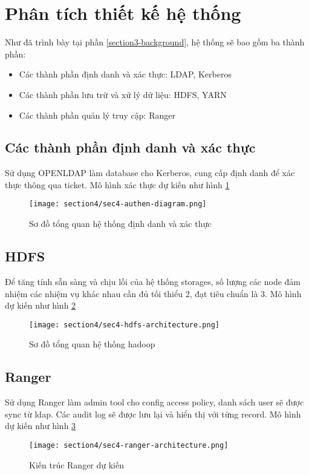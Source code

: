 \section{Phân tích thiết kế hệ thống}
\label{section4-method}

Như đã trình bày tại phần \ref{section3-background}, hệ thống sẽ bao gồm ba thành phần:
\begin{itemize}
    \item Các thành phần định danh và xác thực: LDAP, Kerberos
    \item Các thành phần lưu trữ và xử lý dữ liệu: HDFS, YARN
    \item Các thành phần quản lý truy cập: Ranger
\end{itemize}

\subsection{Các thành phần định danh và xác thực}

Sử dụng OPENLDAP làm database cho Kerberos, cung cấp định danh để xác thực thông qua ticket. Mô hình xác thực dự kiến như hình \ref{fig:sec4-authen-diagram}

\begin{figure}
    \centering
    \texttt{[image: section4/sec4-authen-diagram.png]}
    \caption{Sơ đồ tổng quan hệ thống định danh và xác thực}
    \label{fig:sec4-authen-diagram}
\end{figure}

\subsection{HDFS}

Để tăng tính sẵn sàng và chịu lỗi của hệ thống storages, số lượng các node đảm nhiệm các nhiệm vụ khác nhau cần đủ tối thiểu 2, đạt tiêu chuẩn là 3. Mô hình dự kiến như hình \ref{fig:sec4-hdfs-architecture}

\begin{figure}
    \centering
    \texttt{[image: section4/sec4-hdfs-architecture.png]}
    \caption{Sơ đồ tổng quan hệ thống hadoop}
    \label{fig:sec4-hdfs-architecture}
\end{figure}

\subsection{Ranger}

Sử dụng Ranger làm admin tool cho config access policy, danh sách user sẽ được sync từ ldap. Các audit log sẽ được lưu lại và hiển thị với từng record. Mô hình dự kiến như hình \ref{fig:sec4-ranger-architecture}

\begin{figure}
    \centering
    \texttt{[image: section4/sec4-ranger-architecture.png]}
    \caption{Kiến trúc Ranger dự kiến}
    \label{fig:sec4-ranger-architecture}
\end{figure}